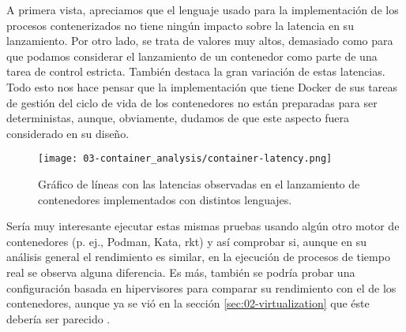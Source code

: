 A primera vista, apreciamos que el lenguaje usado para la implementación de los
procesos contenerizados no tiene ningún impacto sobre la latencia en su
lanzamiento. Por otro lado, se trata de valores muy altos, demasiado como para
que podamos considerar el lanzamiento de un contenedor como parte de una tarea
de control estricta. También destaca la gran variación de estas latencias. Todo esto
nos hace pensar que la implementación que tiene Docker de sus tareas de gestión
del ciclo de vida de los contenedores no están preparadas para ser
deterministas, aunque, obviamente, dudamos de que este aspecto fuera considerado
en su diseño.

\begin{figure}
    \centering
    \texttt{[image: 03-container\_analysis/container-latency.png]}
    \caption{Gráfico de líneas con las latencias observadas en el lanzamiento de
        contenedores implementados con distintos lenguajes.}
    \label{fig:03-container_latency}
\end{figure}

Sería muy interesante ejecutar estas mismas pruebas usando algún otro motor de
contenedores (p. ej., Podman, Kata, rkt) y así comprobar si, aunque en su
análisis general el rendimiento es similar, en la ejecución de procesos de
tiempo real se observa alguna diferencia. Es más, también se podría probar una
configuración basada en hipervisores para comparar su rendimiento con el de los
contenedores, aunque ya se vió en la sección \ref{sec:02-virtualization} que
éste debería ser parecido \cite{manco_my_2017} \cite{felter_updated_2015}.